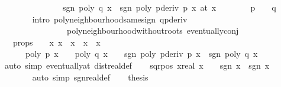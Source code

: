 \begin{isabellebody}
\ \ \ \ \ \ \ \ \ \ \ \ \ \ \ sgn\ {\isacharparenleft}poly\ q\ x{\isacharparenright}\ {\isacharequal}\ sgn\ {\isacharparenleft}poly\ {\isacharparenleft}pderiv\ p{\isacharparenright}\ x{\isacharparenright}{\isacharparenright}\ {\isacharparenleft}at\ x\isanewline
\ \ \ \ \ \ \isamarkupfalse%
\ {\isacharbackquoteopen}p\ {\isasymnoteq}\ {}{\isacharbackquoteclose}\ \ {\isacharbackquoteopen}q\ {\isasymnoteq}\ {}{\isacharbackquoteclose}\isanewline
\ \ \ \ \ \ \isamarkupfalse%
\ {\isacharparenleft}intro\ poly{\isacharunderscore}neighbourhood{\isacharunderscore}same{\isacharunderscore}sign\ q{\isacharunderscore}pderiv\isanewline
\ \ \ \ \ \ \ \ \ \ \ \ \ \ \ \ poly{\isacharunderscore}neighbourhood{\isacharunderscore}without{\isacharunderscore}roots\ eventually{\isacharunderscore}conj{\isacharparenright}\isanewline
\ \ \isamarkupfalse%
\ \isamarkupfalse%
\ {\isasymepsilon}\ \ {\isasymepsilon}{\isacharunderscore}props{\isacharcolon}\ {\isachardoublequoteopen}{\isasymepsilon}\ {\isachargreater}\ {}{\isachardoublequoteclose}\ {\isachardoublequoteopen}{\isasymforall}x{\isachardot}\ x\ {\isasymnoteq}\ x\ {\isasymand}\ {\isasymbar}x\ {\isacharminus}\ x\ {\isacharless}\ {\isasymepsilon}\ {\isasymlongrightarrow}\ \isanewline
\ \ \ \ \ \ poly\ p\ x\ {\isasymnoteq}\ {}\ {\isasymand}\ poly\ q\ x\ {\isasymnoteq}\ {}\ {\isasymand}\ sgn\ {\isacharparenleft}poly\ {\isacharparenleft}pderiv\ p{\isacharparenright}\ x{\isacharparenright}\ {\isacharequal}\ sgn\ {\isacharparenleft}poly\ q\ x{\isacharparenright}{\isachardoublequoteclose}\isanewline
\ \ \ \ \ \ \isamarkupfalse%
\ {\isacharparenleft}auto\ simp{\isacharcolon}\ eventually{\isacharunderscore}at\ dist{\isacharunderscore}real{\isacharunderscore}def{\isacharparenright}\isanewline
\ \ \isamarkupfalse%
\ sqr{\isacharunderscore}pos{\isacharcolon}\ {\isachardoublequoteopen}{\isasymAnd}x{\isacharcolon}{\isacharcolon}real{\isachardot}\ x\ {\isasymnoteq}\ {}\ {\isasymLongrightarrow}\ sgn\ x\ {\isacharasterisk}\ sgn\ x\ {\isacharequal}\ {}{\isachardoublequoteclose}\ \isanewline
\ \ \ \ \ \ \isamarkupfalse%
\ {\isacharparenleft}auto\ simp{\isacharcolon}\ sgn{\isacharunderscore}real{\isacharunderscore}def{\isacharparenright}\isanewline
\isanewline
\ \ \isamarkupfalse%
\ {\isacharquery}thesis\isanewline

\end{isabellebody}
